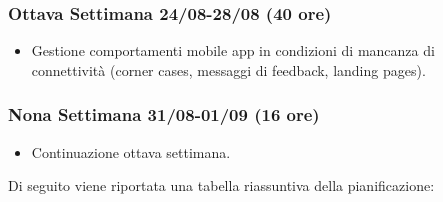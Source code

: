 \begin{trivlist}
\item \subsubsection{Ottava Settimana 24/08-28/08 (40 ore)}
\begin{itemize}
	\item Gestione comportamenti mobile app in condizioni di mancanza di connettività (corner cases, messaggi di feedback, landing pages).
\end{itemize}

\item \subsubsection{Nona Settimana 31/08-01/09 (16 ore)}
\begin{itemize}
	\item Continuazione ottava settimana.
\end{itemize}
\end{trivlist}
Di seguito viene riportata una tabella riassuntiva della pianificazione:
\\


